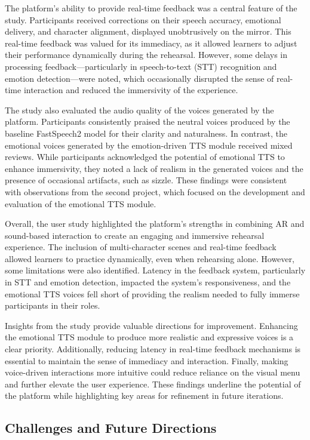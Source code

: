 The platform’s ability to provide real-time feedback was a central feature of the study. Participants received corrections on their speech accuracy, emotional delivery, and character alignment, displayed unobtrusively on the mirror. This real-time feedback was valued for its immediacy, as it allowed learners to adjust their performance dynamically during the rehearsal. However, some delays in processing feedback—particularly in speech-to-text (STT) recognition and emotion detection—were noted, which occasionally disrupted the sense of real-time interaction and reduced the immersivity of the experience.

The study also evaluated the audio quality of the voices generated by the platform. Participants consistently praised the neutral voices produced by the baseline FastSpeech2 model for their clarity and naturalness. In contrast, the emotional voices generated by the emotion-driven TTS module received mixed reviews. While participants acknowledged the potential of emotional TTS to enhance immersivity, they noted a lack of realism in the generated voices and the presence of occasional artifacts, such as sizzle. These findings were consistent with observations from the second project, which focused on the development and evaluation of the emotional TTS module.

Overall, the user study highlighted the platform’s strengths in combining AR and sound-based interaction to create an engaging and immersive rehearsal experience. The inclusion of multi-character scenes and real-time feedback allowed learners to practice dynamically, even when rehearsing alone. However, some limitations were also identified. Latency in the feedback system, particularly in STT and emotion detection, impacted the system’s responsiveness, and the emotional TTS voices fell short of providing the realism needed to fully immerse participants in their roles.

Insights from the study provide valuable directions for improvement. Enhancing the emotional TTS module to produce more realistic and expressive voices is a clear priority. Additionally, reducing latency in real-time feedback mechanisms is essential to maintain the sense of immediacy and interaction. Finally, making voice-driven interactions more intuitive could reduce reliance on the visual menu and further elevate the user experience. These findings underline the potential of the platform while highlighting key areas for refinement in future iterations.

\subsection{Challenges and Future Directions}

